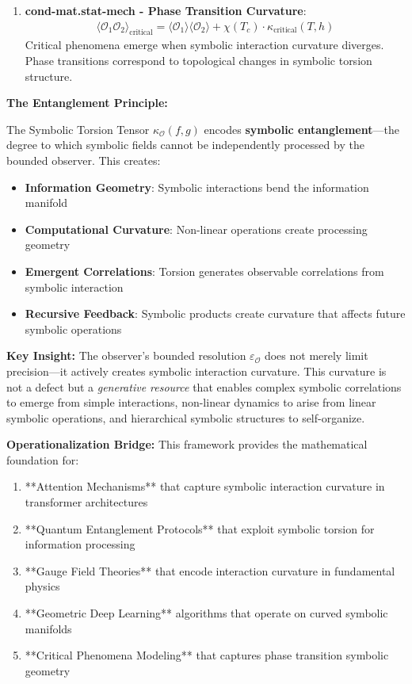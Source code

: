 \begin{scholium}
\begin{enumerate}
\item \textbf{cond-mat.stat-mech - Phase Transition Curvature}:
   \begin{align}
   \langle \mathcal{O}_1 \mathcal{O}_2 \rangle_{\text{critical}} = \langle \mathcal{O}_1 \rangle \langle \mathcal{O}_2 \rangle + \chi(T_c) \cdot \kappa_{\text{critical}}(T, h)
   \end{align}
   Critical phenomena emerge when symbolic interaction curvature diverges. Phase transitions correspond to topological changes in symbolic torsion structure.
\end{enumerate}
\end{scholium}

\textbf{The Entanglement Principle:}

The Symbolic Torsion Tensor $\kappa_{\mathcal{O}}(f, g)$ encodes \textbf{symbolic entanglement}—the degree to which symbolic fields cannot be independently processed by the bounded observer. This creates:

\begin{itemize}
\item \textbf{Information Geometry}: Symbolic interactions bend the information manifold
\item \textbf{Computational Curvature}: Non-linear operations create processing geometry  
\item \textbf{Emergent Correlations}: Torsion generates observable correlations from symbolic interaction
\item \textbf{Recursive Feedback}: Symbolic products create curvature that affects future symbolic operations
\end{itemize}

\textbf{Key Insight:} The observer's bounded resolution $\varepsilon_{\mathcal{O}}$ does not merely limit precision—it actively creates symbolic interaction curvature. This curvature is not a defect but a \textit{generative resource} that enables complex symbolic correlations to emerge from simple interactions, non-linear dynamics to arise from linear symbolic operations, and hierarchical symbolic structures to self-organize.

\textbf{Operationalization Bridge:}
This framework provides the mathematical foundation for:
\begin{enumerate}
\item **Attention Mechanisms** that capture symbolic interaction curvature in transformer architectures
\item **Quantum Entanglement Protocols** that exploit symbolic torsion for information processing
\item **Gauge Field Theories** that encode interaction curvature in fundamental physics
\item **Geometric Deep Learning** algorithms that operate on curved symbolic manifolds
\item **Critical Phenomena Modeling** that captures phase transition symbolic geometry
\end{enumerate}

